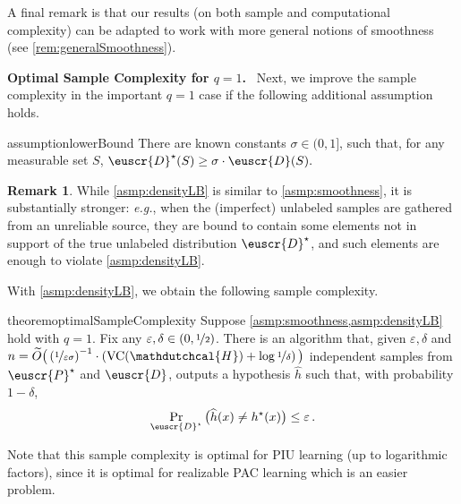 \documentclass[11pt]{article}
\theoremstyle{plain}
\theoremstyle{definition}
\newtheorem{remark}[theorem]{Remark}
\theoremstyle{remark}
\newcommand{\binparen}[1]{\big(#1\big)}
\newcommand{\inparen}[1]{\left(#1\right)}
\newcommand{\nfrac}[2]{\nicefrac{#1}{#2}}
\newcommand{\vc}{\textrm{\rm VC}}
\newcommand{\eps}{\varepsilon}
\newcommand{\wh}[1]{\widehat{#1}}
\newcommand{\wt}[1]{\widetilde{#1}}
\newcommand{\customcal}[1]{\euscr{#1}}
\newcommand{\cD}{\customcal{D}}
\newcommand{\cP}{\customcal{P}}
\renewcommand{\paragraph}[1]{\medskip \noindent\textbf{#1}~}
\newcommand{\eg}{\textit{e.g.}}
\newcommand{\hypo}[1]{\mathdutchcal{#1}}
\newcommand{\hyH}{\hypo{H}}
\newcommand{\cDtrue}{\cD^\star}
\newcommand{\cDgiven}{\cD}
\newcommand{\cPtrue}{\cP^\star}
\begin{document}
        
        \noindent A final remark is that our results (on both sample and computational complexity) can be adapted to work with more general notions of smoothness (see \cref{rem:generalSmoothness}).

        \paragraph{Optimal Sample Complexity for $q=1$.}
        Next, we improve the sample complexity in the important $q=1$ case if the following additional assumption holds. %
        \begin{restatable}{assumption}{lowerBound}\label{asmp:densityLB}
            There are known constants $\sigma\in (0,1]$, such that, for any measurable set $S$, $\cDtrue(S)\geq 
                \sigma
                \cdot \cDgiven(S).$
        \end{restatable}
        \vspace{-5mm}
        \begin{remark}\label{rem:densityLB}
            While \cref{asmp:densityLB} is similar to \cref{asmp:smoothness}, it is substantially stronger: 
            \eg{}, when the (imperfect) unlabeled samples are gathered from an unreliable source, they are bound to contain some elements not in support of the true unlabeled distribution $\cDtrue$, and such elements are enough to violate \cref{asmp:densityLB}.
        \end{remark} 
        With \cref{asmp:densityLB}, we obtain the following sample complexity.
        \begin{restatable}{theorem}{optimalSampleComplexity}
            \label{thm:sampleComplexity:bothSided}
            Suppose \cref{asmp:smoothness,asmp:densityLB} hold with $q=1$. 
            Fix any $\eps,\delta\in (0,\nfrac{1}{2})$.
            There is an algorithm that, given $\eps,\delta$ and $n=\wt{O}\binparen{\inparen{\nfrac{1}{\eps\sigma}}^{-1}\cdot \inparen{\vc{}(\hyH)+\log{\nfrac{1}{\delta}}}}$ independent samples from $\cPtrue$ and $\cDgiven$, outputs a hypothesis $\wh{h}$ such that, with probability $1-\delta$,
            \[ 
                \Pr_{\cDtrue}\binparen{\wh{h}(x)\neq h^\star(x)}\leq \eps\,.
            \]
        \end{restatable}
        Note that this sample complexity is optimal for PIU learning (up to logarithmic factors), since it is optimal for realizable PAC learning which is an easier problem.
\end{document}
